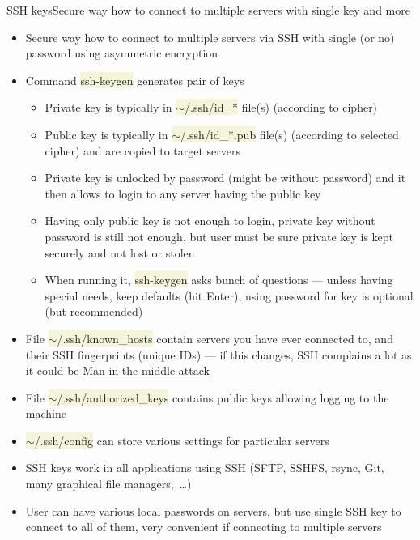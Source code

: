 \documentclass[compress, xelatex, 11pt, xcolor=svgnames, aspectratio=169, url={hyphens, lowtilde}]{beamer}
\renewcommand{\texttt}[1]{\colorbox{Beige}{{\ttfamily #1}}}
\begin{document}
\begin{frame}[allowframebreaks]{SSH keys}{Secure way how to connect to multiple servers with single key and more}
	\begin{itemize}
		\item Secure way how to connect to multiple servers via SSH with single (or no) password using asymmetric encryption
		\item Command \texttt{ssh-keygen} generates pair of keys
		\begin{itemize}
			\item Private key is typically in \texttt{$\sim$/.ssh/id\_*} file(s) (according to cipher)
			\item Public key is typically in \texttt{$\sim$/.ssh/id\_*.pub} file(s) (according to selected cipher) and are copied to target servers
			\item Private key is unlocked by password (might be without password) and it then allows to login to any server having the public key
			\item Having only public key is not enough to login, private key without password is still not enough, but user must be sure private key is kept securely and not lost or stolen
			\item When running it, \texttt{ssh-keygen} asks bunch of questions --- unless having special needs, keep defaults (hit Enter), using password for key is optional (but recommended)
		\end{itemize}
		\item File \texttt{$\sim$/.ssh/known\_hosts} contain servers you have ever connected to, and their SSH fingerprints (unique IDs) --- if this changes, SSH complains a lot as it could be \href{https://en.wikipedia.org/wiki/Man-in-the-middle_attack}{Man-in-the-middle attack}
		\item File \texttt{$\sim$/.ssh/authorized\_keys} contains public keys allowing logging to the machine
		\item \texttt{$\sim$/.ssh/config} can store various settings for particular servers
		\item SSH keys work in all applications using SSH (SFTP, SSHFS, rsync, Git, many graphical file managers,~\ldots)
		\item User can have various local passwords on servers, but use single SSH key to connect to all of them, very convenient if connecting to multiple servers
	\end{itemize}
\end{frame}
\end{document}
